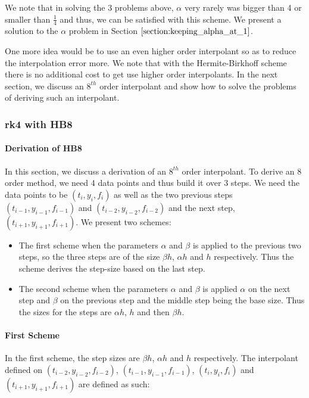 \documentclass{article}
\begin{document}
We note that in solving the 3 problems above, $\alpha$ very rarely was bigger than 4 or smaller than $\frac{1}{4}$ and thus, we can be satisfied with this scheme. We present a solution to the $\alpha$ problem in Section $\ref{section:keeping_alpha_at_1}$.

One more idea would be to use an even higher order interpolant so as to reduce the interpolation error more. We note that with the Hermite-Birkhoff scheme there is no additional cost to get use higher order interpolants. In the next section, we discuss an $8^{th}$ order interpolant and show how to solve the problems of deriving such an interpolant.

\subsubsection{rk4 with HB8}
\paragraph{Derivation of HB8}
In this section, we discuss a derivation of an $8^{th}$ order interpolant. To derive an 8 order method, we need 4 data points and thus build it over 3 steps. We need the data points to be $(t_i, y_i, f_i)$ as well as the two previous steps $(t_{i-1}, y_{i-1}, f_{i-1})$ and $(t_{i-2}, y_{i-2}, f_{i-2})$ and the next step, $(t_{i+1}, y_{i+1}, f_{i+1})$. We present two schemes: 
\begin{itemize}
\item The first scheme when the parameters $\alpha$ and $\beta$ is applied to the previous two steps, so the three steps are of the size $\beta h$, $\alpha h$ and $h$ respectively. Thus the scheme derives the step-size based on the last step. 

\item The second scheme when the parameters $\alpha$ and $\beta$ is applied $\alpha$ on the next step and $\beta$ on the previous step and the middle step being the base size. Thus the sizes for the steps are $\alpha h$, $h$ and then $\beta h$. 

\end{itemize}


\paragraph{First Scheme}
In the first scheme, the step sizes are $\beta h$, $\alpha h$ and $h$ respectively. The interpolant defined on $(t_{i-2}, y_{i-2}, f_{i-2})$, $(t_{i-1}, y_{i-1}, f_{i-1})$, $(t_i, y_i, f_i)$ and $(t_{i + 1}, y_{i + 1}, f_{i + 1})$ are defined as such:
\end{document}
